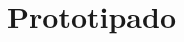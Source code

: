 \documentclass[../candidatura.tex]{subfiles}
\begin{document}
\esborrador

\section{Prototipado}

\newpage
\end{document}
